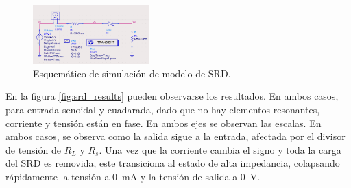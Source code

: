\begin{figure}[t]
  \centering
    \includegraphics[width=0.4\textwidth]{images/srd_validation_schematic.jpg}
    \caption{Esquemático de simulación de modelo de SRD.}
    \label{fig:srd_validation_schematic}
\end{figure}

En la figura \ref{fig:srd_results} pueden observarse los resultados. En ambos
casos, para entrada senoidal y cuadarada, dado que no hay elementos resonantes,
corriente y tensión están en fase. En ambos ejes se observan las escalas. En
ambos casos, se observa como la salida sigue a la entrada, afectada por el
divisor de tensión de $R_L$ y $R_s$. Una vez que la corriente cambia el signo y
toda la carga del SRD es removida, este transiciona al estado de alta
impedancia, colapsando rápidamente la tensión a \qty{0}{\milli\ampere} y la
tensión de salida a \qty{0}{\volt}.

